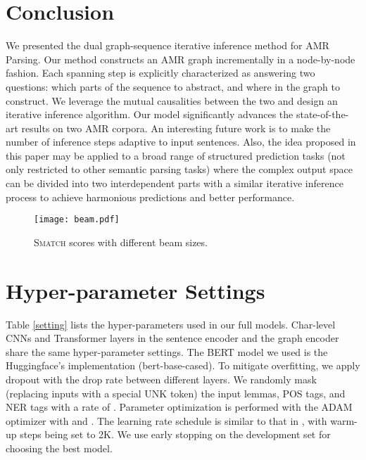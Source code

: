 \documentclass[11pt,a4paper]{article}
\begin{document}
	\section{Conclusion}
	We presented the dual graph-sequence iterative inference method for AMR Parsing. Our method constructs an AMR graph incrementally in a node-by-node fashion. Each spanning step is explicitly characterized as answering two questions: which parts of the sequence to abstract, and where in the graph to construct. We leverage the mutual causalities between the two and design an iterative inference algorithm. Our model significantly advances the state-of-the-art results on two AMR corpora. An interesting future work is to make the number of inference steps adaptive to input sentences. Also, the idea proposed in this paper may be applied to a broad range of structured prediction tasks (not only restricted to other semantic parsing tasks) where the complex output space can be divided into two interdependent parts with a similar iterative inference process to achieve harmonious predictions and better performance.
	\begin{figure}[t]
		\centering
		\texttt{[image: beam.pdf]}
		\caption{\textsc{Smatch} scores with different beam sizes.}
		\label{beam}
	\end{figure}
	
	

\appendix
\newpage
\section{Hyper-parameter Settings}
Table \ref{setting} lists the hyper-parameters used in our full models. Char-level CNNs and Transformer layers in the sentence encoder and the graph encoder share the same hyper-parameter settings. The BERT model \cite{devlin-etal-2019-bert} we used is the Huggingface’s implementation \cite{Wolf2019HuggingFacesTS} (bert-base-cased). To mitigate overfitting, we apply dropout \cite{srivastava2014dropout} with the drop rate  between different layers. We randomly mask (replacing inputs with a special UNK token) the input lemmas, POS tags, and NER tags with a rate of . Parameter optimization is performed with the ADAM optimizer \cite{kingma2014adam} with  and . The learning rate schedule is similar to that in , with warm-up steps being set to 2K. We use early stopping on the development set for choosing the best model.
\end{document}

